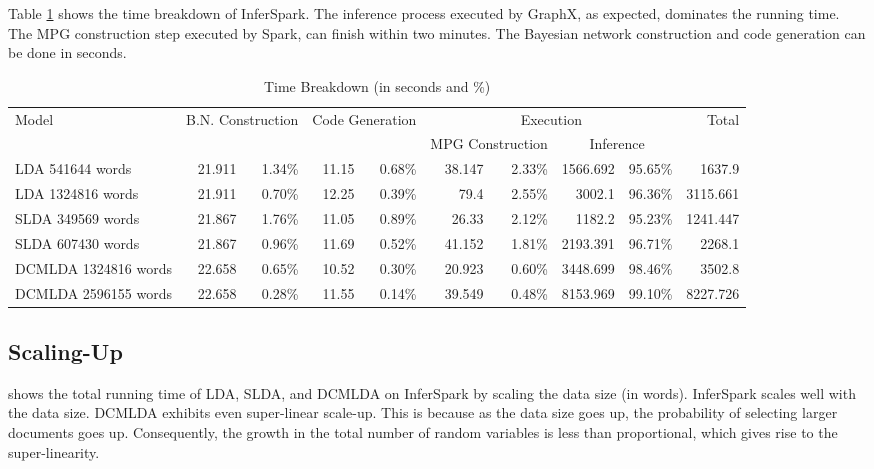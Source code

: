 Table \ref{breakdown} shows the time breakdown of InferSpark.
The inference process executed by GraphX, as expected, dominates the running time.
The MPG construction step executed by Spark, can finish within two minutes.
The Bayesian network construction and code generation can be done in seconds.


\begin{table}
\caption{Time Breakdown (in seconds and \%)}
\label{breakdown}
\small
\begin{tabular}{|l||*{8}{r|}r|}
\hline
Model & \multicolumn{2}{c|}{B.N. Construction} & \multicolumn{2}{c|}{Code Generation}	& \multicolumn{4}{c|}{Execution} & Total \\\cline{6-9} 
  & \multicolumn{2}{c|}{ } & \multicolumn{2}{c|}{ }	& \multicolumn{2}{c|}{MPG Construction} & \multicolumn{2}{c|}{Inference} &	 \\ \hline \hline
LDA 541644 words	& 21.911	& 1.34\%	& 11.15 &	0.68\%	& 38.147	& 2.33\% &	1566.692 & 95.65\%	& 1637.9 \\ \hline
LDA 1324816 words &	21.911 & 0.70\% & 12.25	& 0.39\% & 79.4 & 2.55\%	& 3002.1 & 96.36\% &	3115.661 \\ \hline
SLDA 349569 words &	21.867 & 1.76\% & 11.05 &	0.89\%	& 26.33 & 2.12\% &	1182.2	& 95.23\%	& 1241.447 \\ \hline
SLDA 607430 words & 21.867 & 0.96\%	& 11.69	& 0.52\% & 41.152	& 1.81\%	& 2193.391	& 96.71\%	& 2268.1 \\ \hline
DCMLDA 1324816 words & 22.658 & 0.65\%	& 10.52 & 0.30\% &	20.923	& 0.60\% & 3448.699	& 98.46\% &	3502.8 \\ \hline
DCMLDA 2596155 words & 22.658 & 0.28\% & 11.55 & 0.14\%	& 39.549 & 0.48\%	& 8153.969 & 99.10\%	& 8227.726 \\ \hline

\end{tabular}
\end{table} 





\subsection{Scaling-Up}

 shows the total running time of LDA, SLDA, and DCMLDA on InferSpark
by scaling the data size (in words).
InferSpark scales well with the data size.
DCMLDA exhibits even super-linear scale-up. This is because as the data size goes up, 
the probability of selecting larger documents goes up. Consequently,
the growth in the total number of random variables is less than proportional, which gives rise
to the super-linearity.

